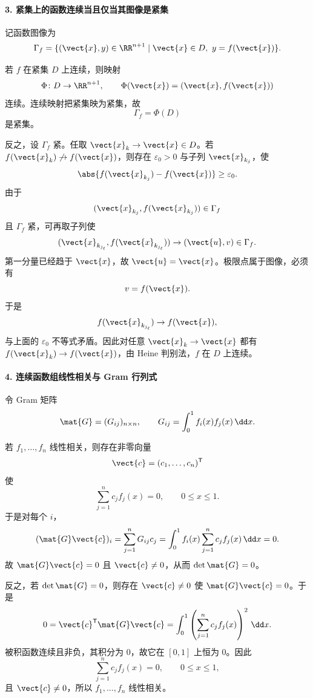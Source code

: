 \paragraph{3. 紧集上的函数连续当且仅当其图像是紧集}
\begin{xsolution}
记函数图像为
\[
  \Gamma_f
  =\{(\vect{x},y)\in\RR^{n+1}\mid
  \vect{x}\in D,\ y=f(\vect{x})\}.
\]

若 $f$ 在紧集 $D$ 上连续，则映射
\[
  \Phi\colon D\to\RR^{n+1},
  \qquad
  \Phi(\vect{x})=(\vect{x},f(\vect{x}))
\]
连续。连续映射把紧集映为紧集，故
\[
  \Gamma_f=\Phi(D)
\]
是紧集。

反之，设 $\Gamma_f$ 紧。任取 $\vect{x}_k\to\vect{x}\in D$。若 $f(\vect{x}_k)\not\to f(\vect{x})$，则存在 $\varepsilon_0>0$ 与子列 $\vect{x}_{k_j}$，使
\[
  \abs{f(\vect{x}_{k_j})-f(\vect{x})}\ge\varepsilon_0.
\]
由于
\[
  (\vect{x}_{k_j},f(\vect{x}_{k_j}))\in\Gamma_f
\]
且 $\Gamma_f$ 紧，可再取子列使
\[
  (\vect{x}_{k_{j_\ell}},f(\vect{x}_{k_{j_\ell}}))
  \to(\vect{u},v)\in\Gamma_f.
\]
第一分量已经趋于 $\vect{x}$，故 $\vect{u}=\vect{x}$。极限点属于图像，必须有
\[
  v=f(\vect{x}).
\]
于是
\[
  f(\vect{x}_{k_{j_\ell}})\to f(\vect{x}),
\]
与上面的 $\varepsilon_0$ 不等式矛盾。因此对任意 $\vect{x}_k\to\vect{x}$ 都有 $f(\vect{x}_k)\to f(\vect{x})$，由 Heine 判别法，$f$ 在 $D$ 上连续。
\end{xsolution}

\paragraph{4. 连续函数组线性相关与 Gram 行列式}
\begin{xsolution}
令 Gram 矩阵
\[
  \mat{G}=(G_{ij})_{n\times n},
  \qquad
  G_{ij}=\int_0^1f_i(x)f_j(x)\,\dd x.
\]

若 $f_1,\ldots,f_n$ 线性相关，则存在非零向量
\[
  \vect{c}=(c_1,\ldots,c_n)^{\mathsf T}
\]
使
\[
  \sum_{j=1}^nc_jf_j(x)=0,
  \qquad0\le x\le1.
\]
于是对每个 $i$，
\[
  (\mat{G}\vect{c})_i
  =\sum_{j=1}^nG_{ij}c_j
  =\int_0^1f_i(x)\sum_{j=1}^nc_jf_j(x)\,\dd x
  =0.
\]
故 $\mat{G}\vect{c}=0$ 且 $\vect{c}\ne0$，从而 $\det\mat{G}=0$。

反之，若 $\det\mat{G}=0$，则存在 $\vect{c}\ne0$ 使 $\mat{G}\vect{c}=0$。于是
\[
  0=\vect{c}^{\mathsf T}\mat{G}\vect{c}
  =\int_0^1
  \left(\sum_{j=1}^nc_jf_j(x)\right)^2\,\dd x.
\]
被积函数连续且非负，其积分为 $0$，故它在 $[0,1]$ 上恒为 $0$。因此
\[
  \sum_{j=1}^nc_jf_j(x)=0,
  \qquad0\le x\le1,
\]
且 $\vect{c}\ne0$，所以 $f_1,\ldots,f_n$ 线性相关。
\end{xsolution}

